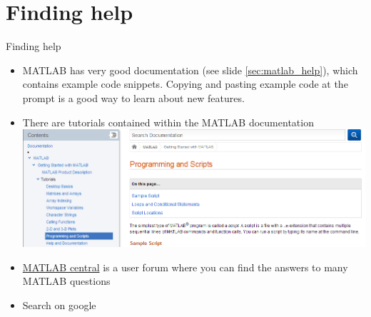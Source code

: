 \documentclass{beamer}
\begin{document}
\section{Finding help}
\begin{frame}{Finding help}
	\begin{itemize}
		\item MATLAB has very good documentation (see slide \ref{sec:matlab_help}), which contains  example code snippets. Copying and pasting example code at the prompt is a good way to learn about new features.
		\item There are tutorials contained within the MATLAB documentation\\		
		\includegraphics[width=\textwidth]{matlab_doc_tutorials}
		\item \href{http://uk.mathworks.com/matlabcentral/?s_tid=gn_mlc}{MATLAB central} is a user forum where you can find the answers to many MATLAB questions
		\item Search on google
	\end{itemize}
\end{frame}
\end{document}
